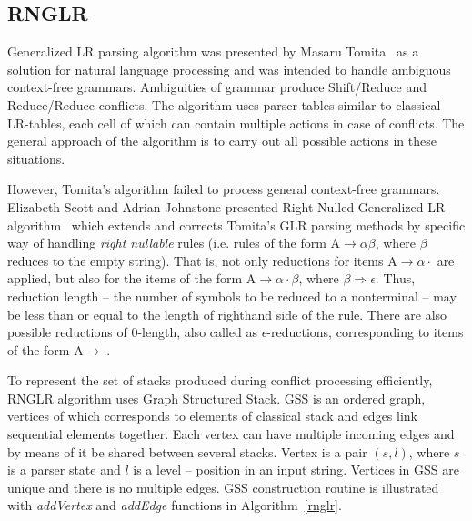 \subsection{RNGLR}
Generalized LR parsing algorithm was presented by Masaru Tomita~\cite{Tomita}
as a solution for natural language processing and was intended to handle ambiguous
context-free grammars. Ambiguities of grammar produce Shift/Reduce and 
Reduce/Reduce conflicts. The algorithm uses parser tables similar to classical LR-tables,
each cell of which can contain multiple actions in case of conflicts. The general approach of 
the algorithm is to carry out all possible actions in these situations. 

However, Tomita's algorithm failed to process general context-free grammars.  
Elizabeth Scott and Adrian Johnstone presented Right-Nulled Generalized LR algorithm~\cite{RNGLR}
which extends and corrects Tomita's GLR parsing methods by
specific way of handling \emph{right nullable} rules (i.e. rules of the form 
$\mathrm{A} \rightarrow \alpha \beta$, where $\beta$ reduces to the empty string). 
That is, not only reductions for items $\mathrm{A} \rightarrow \alpha \cdot$ are 
applied, but also for the items of the form  $\mathrm{A} \rightarrow \alpha \cdot 
\beta$, where $\beta \Rightarrow \epsilon$. Thus, reduction length -- the number of 
symbols to be reduced to a nonterminal -- may be less than or equal to the length 
of righthand side of the rule. There are also possible reductions of 0-length, 
also called as $\epsilon$-reductions, corresponding to items of the form $\mathrm{A} 
\rightarrow \cdot$. 

To represent the set of stacks produced during conflict processing efficiently,
RNGLR algorithm uses Graph Structured Stack. GSS is an ordered graph, 
vertices of which corresponds to elements of classical stack and edges link sequential 
elements together. Each vertex can have multiple incoming edges and by means of 
it be shared between several stacks. Vertex is a pair $(s, l)$, where $s$ is a 
parser state and $l$ is a level -- position in an input string. Vertices in GSS 
are unique and there is no multiple edges. GSS construction routine is illustrated with 
\emph{addVertex} and \emph{addEdge} functions in Algorithm~\ref{rnglr}.

